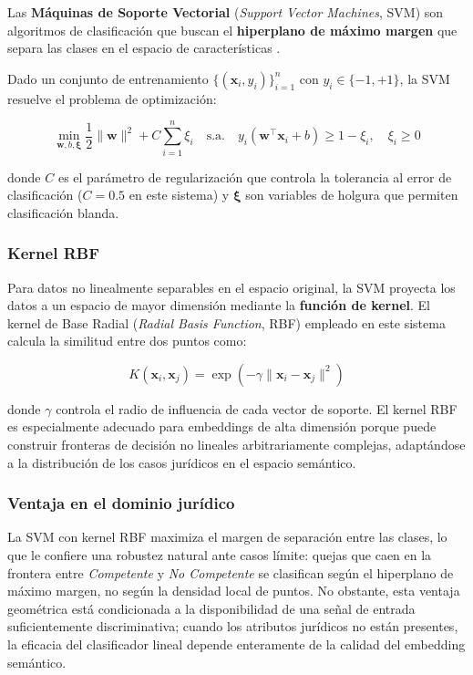 Las \textbf{Máquinas de Soporte Vectorial} (\textit{Support Vector Machines},
SVM) son algoritmos de clasificación que buscan el \textbf{hiperplano de máximo
margen} que separa las clases en el espacio de características \cite{cortes1995}.

Dado un conjunto de entrenamiento $\{(\mathbf{x}_i, y_i)\}_{i=1}^n$ con
$y_i \in \{-1, +1\}$, la SVM resuelve el problema de optimización:

\begin{equation}
  \min_{\mathbf{w}, b, \boldsymbol{\xi}}
  \frac{1}{2}\|\mathbf{w}\|^2 + C \sum_{i=1}^n \xi_i
  \quad \text{s.a.} \quad
  y_i(\mathbf{w}^\top \mathbf{x}_i + b) \geq 1 - \xi_i, \quad \xi_i \geq 0
  \label{eq:svm}
\end{equation}

donde $C$ es el parámetro de regularización que controla la tolerancia al error
de clasificación ($C = 0.5$ en este sistema) y $\boldsymbol{\xi}$ son variables
de holgura que permiten clasificación blanda.

\subsubsection*{Kernel RBF}

Para datos no linealmente separables en el espacio original, la SVM proyecta
los datos a un espacio de mayor dimensión mediante la \textbf{función de kernel}.
El kernel de Base Radial (\textit{Radial Basis Function}, RBF) empleado en este
sistema calcula la similitud entre dos puntos como:

\begin{equation}
  K(\mathbf{x}_i, \mathbf{x}_j)
  = \exp\!\left(-\gamma \|\mathbf{x}_i - \mathbf{x}_j\|^2\right)
  \label{eq:rbf}
\end{equation}

donde $\gamma$ controla el radio de influencia de cada vector de soporte. El
kernel RBF es especialmente adecuado para embeddings de alta dimensión porque
puede construir fronteras de decisión no lineales arbitrariamente complejas,
adaptándose a la distribución de los casos jurídicos en el espacio semántico.

\subsubsection*{Ventaja en el dominio jurídico}

La SVM con kernel RBF maximiza el margen de separación entre las clases, lo
que le confiere una robustez natural ante casos límite: quejas que caen en la
frontera entre \textit{Competente} y \textit{No Competente} se clasifican
según el hiperplano de máximo margen, no según la densidad local de puntos.
No obstante, esta ventaja geométrica está condicionada a la disponibilidad de
una señal de entrada suficientemente discriminativa; cuando los atributos
jurídicos no están presentes, la eficacia del clasificador lineal depende
enteramente de la calidad del embedding semántico.

